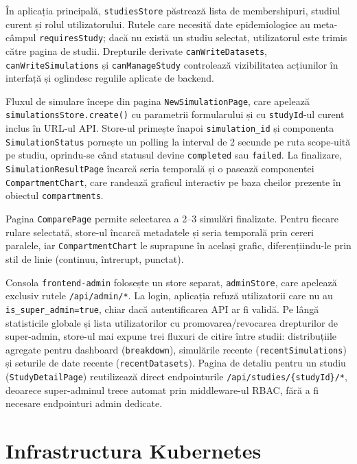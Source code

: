 În aplicația principală, \texttt{studiesStore} păstrează lista de membershipuri,
studiul curent și rolul utilizatorului. Rutele care necesită date epidemiologice
au meta-câmpul \texttt{requiresStudy}; dacă nu există un studiu selectat,
utilizatorul este trimis către pagina de studii. Drepturile derivate
\texttt{canWriteDatasets}, \texttt{canWriteSimulations} și
\texttt{canManageStudy} controlează vizibilitatea acțiunilor în interfață și
oglindesc regulile aplicate de backend.

Fluxul de simulare începe din pagina \texttt{NewSimulationPage}, care apelează
\texttt{simulationsStore.create()} cu parametrii formularului și cu
\texttt{studyId}-ul curent inclus în URL-ul API. Store-ul primește înapoi
\texttt{simulation\_id} și componenta \texttt{SimulationStatus} pornește un
polling la interval de 2 secunde pe ruta scope-uită pe studiu, oprindu-se când
statusul devine \texttt{completed} sau \texttt{failed}. La finalizare,
\texttt{SimulationResultPage} încarcă seria temporală și o pasează componentei
\texttt{CompartmentChart}, care randează graficul interactiv pe baza cheilor
prezente în obiectul \texttt{compartments}.

Pagina \texttt{ComparePage} permite selectarea a 2--3 simulări finalizate.
Pentru fiecare rulare selectată, store-ul încarcă metadatele și seria temporală
prin cereri paralele, iar \texttt{CompartmentChart} le suprapune în același
grafic, diferențiindu-le prin stil de linie (continuu, întrerupt, punctat).

Consola \texttt{frontend-admin} folosește un store separat, \texttt{adminStore},
care apelează exclusiv rutele \texttt{/api/admin/*}. La login, aplicația refuză
utilizatorii care nu au \texttt{is\_super\_admin=true}, chiar dacă autentificarea
API ar fi validă. Pe lângă statisticile globale și lista utilizatorilor cu
promovarea/revocarea drepturilor de super-admin, store-ul mai expune trei
fluxuri de citire între studii: distribuțiile agregate pentru dashboard
(\texttt{breakdown}), simulările recente (\texttt{recentSimulations}) și
seturile de date recente (\texttt{recentDatasets}). Pagina de detaliu pentru un
studiu (\texttt{StudyDetailPage}) reutilizează direct endpointurile
\texttt{/api/studies/\{studyId\}/*}, deoarece super-adminul trece automat prin
middleware-ul RBAC, fără a fi necesare endpointuri admin dedicate.

\section{Infrastructura Kubernetes}
\label{sec:infrastructura_k8s}

